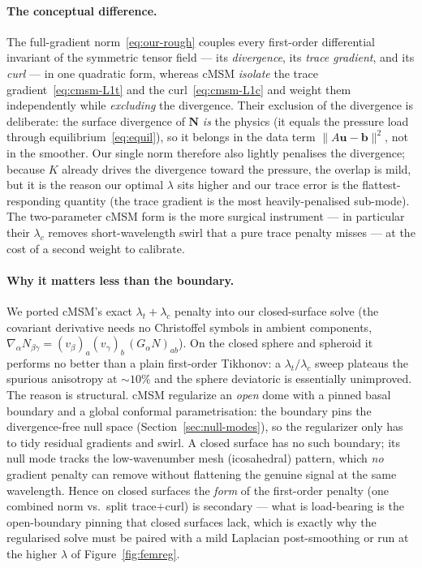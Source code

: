 \documentclass[11pt]{article}
\newcommand{\vv}[1]{\bm{#1}}          %
\newcommand{\NN}{\vv{N}}               %
\begin{document}
\paragraph{The conceptual difference.}  The full-gradient norm~\eqref{eq:our-rough}
couples every first-order differential invariant of the symmetric tensor field --- its
\emph{divergence}, its \emph{trace gradient}, and its \emph{curl} --- in one quadratic
form, whereas cMSM \emph{isolate} the trace gradient~\eqref{eq:cmsm-L1t} and the
curl~\eqref{eq:cmsm-L1c} and weight them independently while \emph{excluding} the
divergence.  Their exclusion of the divergence is deliberate: the surface divergence
of $\NN$ \emph{is} the physics (it equals the pressure load through
equilibrium~\eqref{eq:equil}), so it belongs in the data term $\|A\vv u-\vv b\|^2$, not
in the smoother.  Our single norm therefore also lightly penalises the divergence;
because $K$ already drives the divergence toward the pressure, the overlap is mild, but
it is the reason our optimal $\lambda$ sits higher and our trace error is the
flattest-responding quantity (the trace gradient is the most heavily-penalised
sub-mode).  The two-parameter cMSM form is the more surgical instrument --- in
particular their $\lambda_c$ removes short-wavelength swirl that a pure trace penalty
misses --- at the cost of a second weight to calibrate.

\paragraph{Why it matters less than the boundary.}  We ported cMSM's exact
$\lambda_t+\lambda_c$ penalty into our closed-surface solve (the covariant derivative
needs no Christoffel symbols in ambient components,
$\nabla_\alpha N_{\beta\gamma}=(v_\beta)_a(v_\gamma)_b\,(G_\alpha N)_{ab}$).  On the
closed sphere and spheroid it performs no better than a plain first-order Tikhonov: a
$\lambda_t/\lambda_c$ sweep plateaus the spurious anisotropy at ${\sim}10\%$ and the
sphere deviatoric is essentially unimproved.  The reason is structural.  cMSM regularize
an \emph{open} dome with a pinned basal boundary and a global conformal
parametrisation: the boundary pins the divergence-free null space
(Section~\ref{sec:null-modes}), so the regularizer only has to tidy residual gradients
and swirl.  A closed surface has no such boundary; its null mode tracks the
low-wavenumber mesh (icosahedral) pattern, which \emph{no} gradient penalty can remove
without flattening the genuine signal at the same wavelength.  Hence on closed surfaces
the \emph{form} of the first-order penalty (one combined norm vs.\ split
trace$+$curl) is secondary --- what is load-bearing is the open-boundary pinning that
closed surfaces lack, which is exactly why the regularised solve must be paired with a
mild Laplacian post-smoothing or run at the higher $\lambda$ of
Figure~\ref{fig:femreg}.
\end{document}

